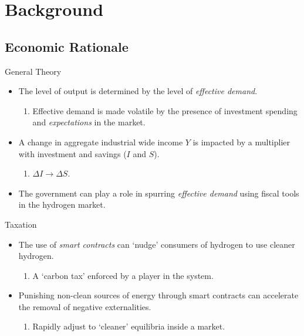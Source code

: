 \section{Background}
\subsection{Economic Rationale}
\begin{frame}{General Theory}
    \begin{itemize}
        \item The level of output is determined by the level of
              \textit{effective demand}.
              \begin{enumerate}
                  \item Effective demand is made volatile by the
                        presence of investment spending and
                        \textit{expectations} in the market.
              \end{enumerate}
        \item A change in aggregate industrial wide income $Y$ is
              impacted by a multiplier with investment
              and savings ($I$ and $S$).
              \begin{enumerate}
                  \item $\Delta I \rightarrow \Delta S$.
              \end{enumerate}
        \item The government can play a role in spurring \textit{effective
                  demand} using fiscal tools in the hydrogen market.
    \end{itemize}
\end{frame}
\begin{frame}{Taxation}
    \begin{itemize}
        \item The use of \textit{smart contracts} can `nudge' consumers of
              hydrogen to use cleaner hydrogen.
              \begin{enumerate}
                  \item A `carbon tax' enforced by a player in the system.
              \end{enumerate}
        \item Punishing non-clean sources of energy through smart contracts
              can accelerate the removal of negative externalities.
              \begin{enumerate}
                  \item Rapidly adjust to `cleaner' equilibria inside a market.
              \end{enumerate}
    \end{itemize}
\end{frame}
